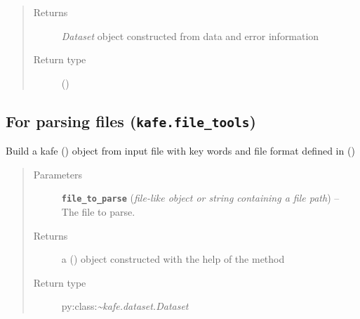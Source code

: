 \documentclass[a4paper,10pt,english]{sphinxmanual}
\begin{document}
\begin{fulllineitems}
\begin{quote}
\begin{description}
\begin{itemize}
\end{itemize}

\item[{Returns}] \leavevmode
\emph{Dataset} object constructed from data and error information

\item[{Return type}] \leavevmode
{\hyperref[module_doc:kafe.dataset.Dataset]{\emph{}}} ()

\end{description}\end{quote}

\end{fulllineitems}



\subsection{For parsing files (\texttt{kafe.file\_tools})}
\label{module_doc:module-kafe.file_tools}\label{module_doc:for-parsing-files-kafe-file-tools}\label{module_doc:module-file_tools}

\begin{fulllineitems}
\label{module_doc:kafe.file_tools.buildDataset_fromFile}
Build a kafe {\hyperref[module_doc:kafe.dataset.Dataset]{\emph{}}} () object from input file
with key words and file format defined in
{\hyperref[module_doc:kafe.file_tools.parse_general_inputfile]{\emph{}}} ()
\begin{quote}\begin{description}
\item[{Parameters}] \leavevmode
\textbf{\texttt{file\_to\_parse}} (\emph{file-like object or string containing a file path}) -- The file to parse.

\item[{Returns}] \leavevmode
a {\hyperref[module_doc:kafe.dataset.Dataset]{\emph{}}} () object
constructed with the help of the method

\item[{Return type}] \leavevmode
py:class:\emph{\textasciitilde{}kafe.dataset.Dataset}

\end{description}\end{quote}

\end{fulllineitems}
\end{document}
